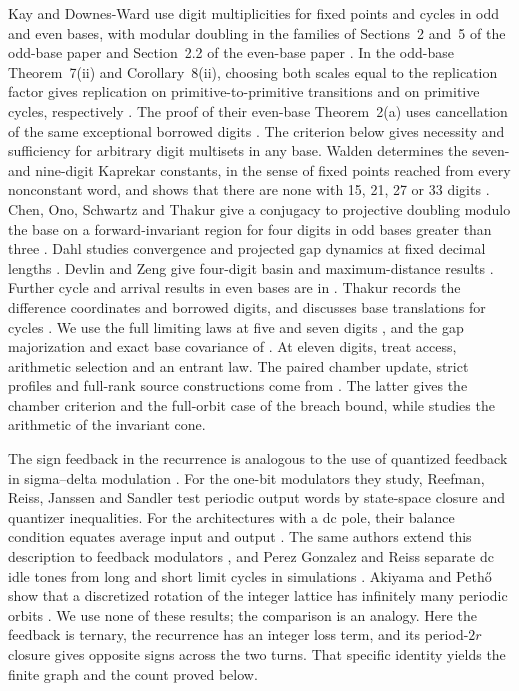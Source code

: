 \documentclass[11pt]{amsart}
\theoremstyle{definition}
\begin{document}
Kay and Downes-Ward use digit multiplicities for fixed points and cycles
in odd and even bases, with modular doubling in the families of
Sections~2 and~5 of the odd-base paper \cite{KDO} and Section~2.2 of the
even-base paper \cite{KDE}. In the odd-base Theorem~7(ii) and
Corollary~8(ii), choosing both scales equal to the replication factor
gives replication on primitive-to-primitive transitions and on primitive
cycles, respectively \cite{KDO}. The proof of their even-base
Theorem~2(a) uses cancellation of the same exceptional borrowed digits
\cite{KDE}. The criterion below gives necessity and sufficiency for
arbitrary digit multisets in any base. Walden determines the seven- and
nine-digit Kaprekar constants, in the sense of fixed points reached from
every nonconstant word, and shows that there are none with 15, 21, 27 or
33 digits \cite{Walden}. Chen, Ono, Schwartz and Thakur give a conjugacy
to projective doubling modulo the base on a forward-invariant region for
four digits in odd bases greater than three \cite[Theorem~1]{COST}.
Dahl studies convergence and projected gap
dynamics at fixed decimal lengths \cite[Sections~2--3]{Dahl}.
Devlin and Zeng give four-digit basin and maximum-distance results
\cite[Theorems~1--2]{DZ}. Further cycle and arrival results in even
bases are in \cite{G1,G2}. Thakur records the difference coordinates and borrowed digits, and
discusses base translations for cycles \cite[Section~2.7 and Remark~4.3]{Thakur}.
We use the full limiting laws at five and seven digits \cite{G3,G5}, and the gap majorization and exact base
covariance of \cite{G4}. At eleven digits, \cite{G6,G7,G8} treat
access, arithmetic selection and an entrant law.
The paired chamber update, strict profiles and full-rank source
constructions come from \cite{G9,G10}. The latter gives the chamber
criterion and the full-orbit case of the breach bound, while \cite{G11}
studies the arithmetic of the invariant cone.

The sign feedback in the recurrence is analogous to the use of quantized
feedback in sigma--delta modulation \cite[Section~3.2, equation~(31)]{DD}.
For the one-bit modulators they study, Reefman, Reiss, Janssen and
Sandler test periodic output words by state-space closure and quantizer
inequalities. For the architectures with a dc pole, their balance
condition equates average input and output \cite[Sections~II--III,
equations~(5), (9) and (15), and Appendix~A]{RRJS}. The same authors
extend this description to feedback modulators \cite{RRJS2}, and Perez
Gonzalez and Reiss separate dc idle tones from long and short limit
cycles in simulations \cite{PGR}. Akiyama and Peth\H{o} show that a
discretized rotation of the integer lattice has infinitely many periodic
orbits \cite{AP}. We use none of these results; the comparison is an
analogy. Here the feedback is ternary, the recurrence has an integer
loss term, and its period-\(2r\) closure gives opposite signs across the
two turns. That specific identity yields the finite graph and the count
proved below.
\end{document}
